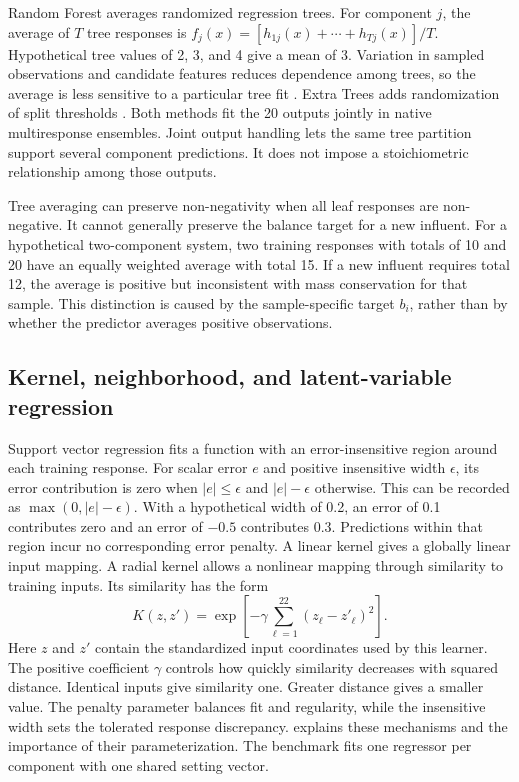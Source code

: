 Random Forest averages randomized regression trees. For component $j$, the average of $T$ tree responses is $f_j(x)=[h_{1j}(x)+\cdots+h_{Tj}(x)]/T$. Hypothetical tree values of 2, 3, and 4 give a mean of 3. Variation in sampled observations and candidate features reduces dependence among trees, so the average is less sensitive to a particular tree fit \citep{Breiman2001}. Extra Trees adds randomization of split thresholds \citep{Geurts2006}. Both methods fit the 20 outputs jointly in native multiresponse ensembles. Joint output handling lets the same tree partition support several component predictions. It does not impose a stoichiometric relationship among those outputs.

Tree averaging can preserve non-negativity when all leaf responses are non-negative. It cannot generally preserve the balance target for a new influent. For a hypothetical two-component system, two training responses with totals of 10 and 20 have an equally weighted average with total 15. If a new influent requires total 12, the average is positive but inconsistent with mass conservation for that sample. This distinction is caused by the sample-specific target $b_i$, rather than by whether the predictor averages positive observations.

\subsection{Kernel, neighborhood, and latent-variable regression}

Support vector regression fits a function with an error-insensitive region around each training response. For scalar error $e$ and positive insensitive width $\epsilon$, its error contribution is zero when $|e|\leq\epsilon$ and $|e|-\epsilon$ otherwise. This can be recorded as $\max(0,|e|-\epsilon)$. With a hypothetical width of 0.2, an error of 0.1 contributes zero and an error of $-0.5$ contributes 0.3. Predictions within that region incur no corresponding error penalty. A linear kernel gives a globally linear input mapping. A radial kernel allows a nonlinear mapping through similarity to training inputs. Its similarity has the form
\[
K(z,z')=\exp\!\left[-\gamma\sum_{\ell=1}^{22}(z_\ell-z'_\ell)^2\right].
\]
Here $z$ and $z'$ contain the standardized input coordinates used by this learner. The positive coefficient $\gamma$ controls how quickly similarity decreases with squared distance. Identical inputs give similarity one. Greater distance gives a smaller value. The penalty parameter balances fit and regularity, while the insensitive width sets the tolerated response discrepancy. \citet{SmolaScholkopf2004} explains these mechanisms and the importance of their parameterization. The benchmark fits one regressor per component with one shared setting vector.

